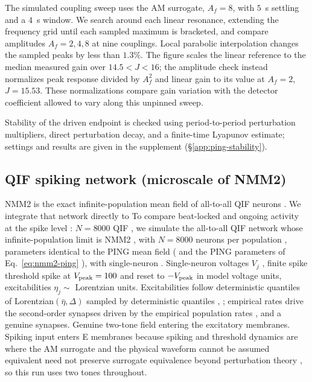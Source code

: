 \documentclass[11pt,a4paper]{article}
\providecommand{\DIFaddtex}[1]{{\protect\color{blue} \sf #1}} %
\providecommand{\DIFdeltex}[1]{{\protect\color{red} \scriptsize #1}} %
\providecommand{\DIFaddbegin}{} %
\providecommand{\DIFaddend}{} %
\providecommand{\DIFdelbegin}{} %
\providecommand{\DIFdelend}{} %
\providecommand{\DIFadd}[1]{\texorpdfstring{\DIFaddtex{#1}}{#1}} %
\providecommand{\DIFdel}[1]{\texorpdfstring{\DIFdeltex{#1}}{}} %
\begin{document}
The simulated coupling sweep uses the AM surrogate, $A_f=8$, with $5$~s
settling and a $4$~s window. We search around each linear resonance, extending
the frequency grid until each sampled maximum is bracketed, and compare
amplitudes $A_f=2,4,8$ at nine couplings. Local parabolic interpolation changes
the sampled peaks by less than $1.3\%$. The figure scales the linear reference
to the median measured gain over $14.5<J<16$; the amplitude check instead
normalizes peak response divided by $A_f^2$ and linear gain to its value at
$A_f=2$, $J=15.53$. These normalizations compare gain variation with the detector coefficient
allowed to vary along this unpinned sweep.


\fi

Stability of the driven endpoint is checked using period-to-period perturbation
multipliers, direct perturbation decay, and a finite-time Lyapunov estimate;
settings and results are given in the supplement (\S\ref{app:ping-stability}).

\subsection{QIF spiking network (microscale of NMM2)}\label{sec:qif-methods}
\DIFdelbegin \DIFdel{NMM2 is the exact infinite-population mean field of all-to-all QIF neurons
\cite{montbrio2015,ruffini2025rosetta,clusella2023}. We integrate that network directly
to }\DIFdelend \DIFaddbegin \DIFadd{To }\DIFaddend compare beat-locked and ongoing activity at the spike level\DIFdelbegin \DIFdel{: $N=8000$ QIF }\DIFdelend \DIFaddbegin \DIFadd{, we simulate
the all-to-all QIF network whose infinite-population limit is
NMM2 \cite{montbrio2015,ruffini2025rosetta,clusella2023}, with $N=8000$
}\DIFaddend neurons per population \DIFdelbegin \DIFdel{, parameters identical to the PING mean field (}\DIFdelend \DIFaddbegin \DIFadd{and the PING parameters of }\DIFaddend Eq.~\eqref{eq:nmm2-ping}\DIFdelbegin \DIFdel{),
with single-neuron }\DIFdelend \DIFaddbegin \DIFadd{.
Single-neuron }\DIFaddend voltages $V_j$ \DIFdelbegin \DIFdel{, finite spike threshold }\DIFdelend \DIFaddbegin \DIFadd{spike at }\DIFaddend $V_{\rm peak}=100$ and reset \DIFaddbegin \DIFadd{to
}\DIFaddend $-V_{\rm peak}$ in model \DIFdelbegin \DIFdel{voltage units, excitabilities $\eta_j\sim$ Lorentzian}\DIFdelend \DIFaddbegin \DIFadd{units. Excitabilities follow deterministic
quantiles of Lorentzian}\DIFaddend $(\bar\eta,\Delta)$\DIFdelbegin \DIFdel{sampled by deterministic
quantiles , }\DIFdelend \DIFaddbegin \DIFadd{; empirical rates drive the
}\DIFaddend second-order \DIFdelbegin \DIFdel{synapses driven by the empirical population rates , and a genuine
}\DIFdelend \DIFaddbegin \DIFadd{synapses. Genuine }\DIFaddend two-tone \DIFdelbegin \DIFdel{field entering the
excitatory membranes. Spiking }\DIFdelend \DIFaddbegin \DIFadd{input enters E membranes because
spiking }\DIFaddend and threshold dynamics \DIFdelbegin \DIFdel{are
where the AM surrogate and the physical waveform cannot be assumed equivalent }\DIFdelend \DIFaddbegin \DIFadd{need not preserve surrogate equivalence
}\DIFaddend beyond perturbation theory\DIFdelbegin \DIFdel{, so this run uses two tones throughout}\DIFdelend .
\end{document}
